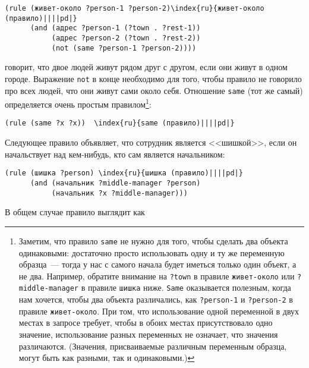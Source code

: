 \begin{Verbatim}[fontsize=\small]
(rule (живет-около ?person-1 ?person-2)\index{ru}{живет-около (правило)||||pd|}
      (and (адрес ?person-1 (?town . ?rest-1))
           (адрес ?person-2 (?town . ?rest-2))
           (not (same ?person-1 ?person-2))))
\end{Verbatim}
говорит, что двое людей живут рядом друг с другом, если они живут в
одном городе.  Выражение {\tt not} в конце необходимо для того,
чтобы правило не говорило про всех людей, что они живут сами около
себя.  Отношение {\tt same} (тот же самый) определяется очень
простым правилом\footnote{Заметим, что правило {\tt same} не нужно для
того, чтобы сделать два объекта одинаковыми: достаточно просто
использовать одну и ту же переменную образца~--- тогда у нас с самого
начала будет иметься только один объект, а не два.  Например, обратите
внимание на {\tt ?town} в правиле {\tt живет-около} или
{\tt ?middle-manager} в правиле {\tt шишка}
ниже. {\tt Same} оказывается полезным, когда нам хочется,
чтобы два объекта различались, как {\tt ?person-1} и
{\tt ?person-2} в правиле {\tt живет-около}.  При том,
что использование одной переменной в двух местах в запросе требует,
чтобы в обоих местах присутствовало одно значение, использование
разных переменных не означает, что значения различаются.
(Значения, присваиваемые различным переменным образца, могут быть как
разными, так и одинаковыми.)}:

\begin{Verbatim}[fontsize=\small]
(rule (same ?x ?x))  \index{ru}{same (правило)||||pd|}
\end{Verbatim}

Следующее правило объявляет, что сотрудник является
<<шишкой>>, если он начальствует над кем-нибудь, кто сам является
начальником:

\begin{Verbatim}[fontsize=\small]
(rule (шишка ?person) \index{ru}{шишка (правило)||||pd|}
      (and (начальник ?middle-manager ?person)
           (начальник ?x ?middle-manager)))
\end{Verbatim}

В общем случае правило выглядит как


